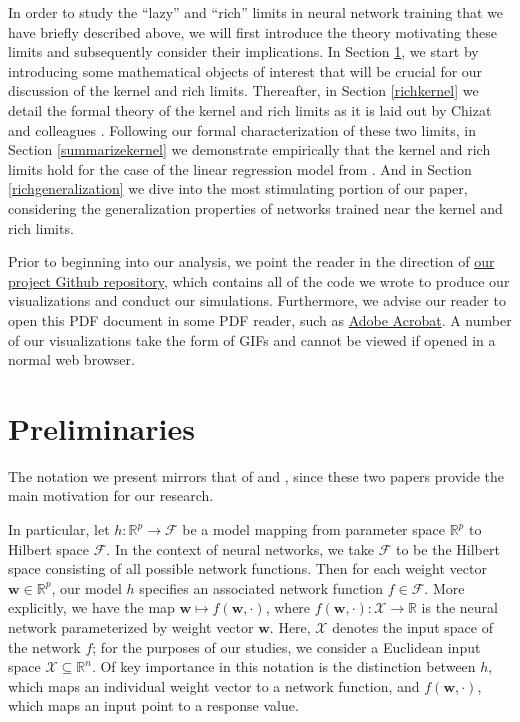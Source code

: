 \documentclass{article}
\begin{document}
In order to study the \enquote{lazy} and \enquote{rich} limits in neural network training that we have briefly described above, we will first introduce the theory motivating these limits and subsequently consider their implications. In Section \ref{preliminaries}, we start by introducing some mathematical objects of interest that will be crucial for our discussion of the kernel and rich limits. Thereafter, in Section \ref{richkernel} we detail the formal theory of the kernel and rich limits as it is laid out by Chizat and colleagues \cite{chizat2019lazy}. Following our formal characterization of these two limits, in Section \ref{summarizekernel} we demonstrate empirically that the kernel and rich limits hold for the case of the linear regression model from \cite{woodworth2020kernel}. And in Section \ref{richgeneralization} we dive into the most stimulating portion of our paper, considering the generalization properties of networks trained near the kernel and rich limits.

Prior to beginning into our analysis, we point the reader in the direction of \href{https://github.com/smithhenryd/NN-Kernel-and-Rich-Regimes}{our project Github repository}, which contains all of the code we wrote to produce our visualizations and conduct our simulations. Furthermore, we advise our reader to open this PDF document in some PDF reader, such as \href{https://www.adobe.com/acrobat/pdf-reader.html}{Adobe Acrobat}. A number of our visualizations take the form of GIFs and cannot be viewed if opened in a normal web browser.

\section{Preliminaries}\label{preliminaries}

The notation we present mirrors that of \cite{chizat2019lazy} and \cite{woodworth2020kernel}, since these two papers provide the main motivation for our research.

In particular, let $h: \mathbb{R}^p \rightarrow \mathcal{F}$ be a model mapping from parameter space $\mathbb{R}^p$ to Hilbert space $\mathcal{F}$. In the context of neural networks, we take $\mathcal{F}$ to be the Hilbert space consisting of all possible network functions. Then for each weight vector $\boldsymbol{w} \in \mathbb{R}^p$, our model $h$ specifies an associated network function $f \in \mathcal{F}$. More explicitly, we have the map $\boldsymbol{w} \mapsto f(\boldsymbol{w}, \cdot)$, where $f(\boldsymbol{w}, \cdot): \mathcal{X} \rightarrow \mathbb{R}$ is the neural network parameterized by weight vector $\boldsymbol{w}$. Here, $\mathcal{X}$ denotes the input space of the network $f$; for the purposes of our studies, we consider a Euclidean input space $\mathcal{X} \subseteq \mathbb{R}^n$. Of key importance in this notation is the distinction between $h$, which maps an individual weight vector to a network function, and $f(\boldsymbol{w}, \cdot)$, which maps an input point to a response value.
\end{document}
